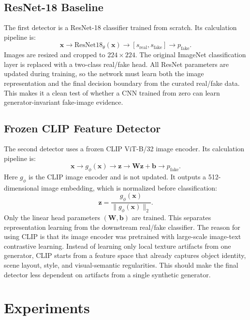 \documentclass[conference]{IEEEtran}
\begin{document}
\subsection{ResNet-18 Baseline}

The first detector is a ResNet-18 classifier trained from scratch. Its
calculation pipeline is:
\begin{equation}
\mathbf{x}
\rightarrow
\mathrm{ResNet18}_{\theta}(\mathbf{x})
\rightarrow
[s_{\mathrm{real}},s_{\mathrm{fake}}]
\rightarrow
p_{\mathrm{fake}}.
\end{equation}
Images are resized and cropped to $224 \times 224$. The original ImageNet
classification layer is replaced with a two-class real/fake head. All ResNet
parameters are updated during training, so the network must learn both the
image representation and the final decision boundary from the curated
real/fake data. This makes it a clean test of whether a CNN trained from zero
can learn generator-invariant fake-image evidence.

\subsection{Frozen CLIP Feature Detector}

The second detector uses a frozen CLIP ViT-B/32 image encoder. Its calculation
pipeline is:
\begin{equation}
\mathbf{x}
\rightarrow
g_{\phi}(\mathbf{x})
\rightarrow
\mathbf{z}
\rightarrow
\mathbf{W}\mathbf{z}+\mathbf{b}
\rightarrow
p_{\mathrm{fake}}.
\end{equation}
Here $g_{\phi}$ is the CLIP image encoder and is not updated. It outputs a
512-dimensional image embedding, which is normalized before classification:
\begin{equation}
\mathbf{z}=
\frac{g_{\phi}(\mathbf{x})}
{\|g_{\phi}(\mathbf{x})\|_2}.
\end{equation}
Only the linear head parameters $(\mathbf{W},\mathbf{b})$ are trained. This
separates representation learning from the downstream real/fake classifier.
The reason for using CLIP is that its image encoder was pretrained with
large-scale image-text contrastive learning. Instead of learning only local
texture artifacts from one generator, CLIP starts from a feature space that
already captures object identity, scene layout, style, and visual-semantic
regularities. This should make the final detector less dependent on artifacts
from a single synthetic generator.

\section{Experiments}
\end{document}
